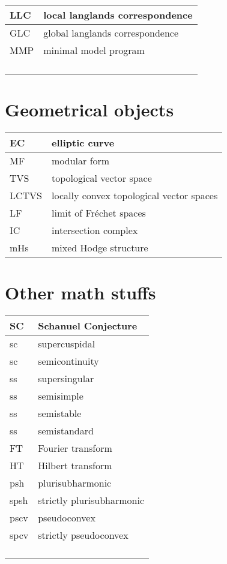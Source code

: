 \documentclass{amsart}
\numberwithin{equation}{section}
\theoremstyle{plain}
\numberwithin{equation}{section}
\theoremstyle{remark}
\begin{document}
\begin{longtable}{l|l}
\hline
LLC & local langlands correspondence \\ \hline
GLC & global langlands correspondence  \\ \hline
MMP & minimal model program\\ \hline
 & \\ \hline
 & \\ \hline
 & \\ \hline
 & \\ \hline
\end{longtable}

\section{Geometrical objects}
\begin{longtable}{l|l}
\hline
EC & elliptic curve \\ \hline
MF & modular form  \\ \hline
TVS & topological vector space\\ \hline
LCTVS &  locally convex topological vector spaces\\ \hline
LF & limit of Fréchet spaces\\ \hline
IC & intersection complex\\ \hline
mHs & mixed Hodge structure\\ \hline
\end{longtable}

\section{Other math stuffs}
\begin{longtable}{l|l}
\hline
SC & Schanuel Conjecture \\ \hline
sc & supercuspidal\\ \hline
sc & semicontinuity\\ \hline
ss & supersingular\\ \hline
ss & semisimple\\ \hline
ss & semistable\\ \hline
ss & semistandard\\ \hline
FT & Fourier transform\\ \hline
HT & Hilbert transform\\ \hline
psh & plurisubharmonic\\ \hline
spsh & strictly plurisubharmonic\\ \hline
pscv & pseudoconvex\\ \hline
spcv & strictly pseudoconvex\\ \hline 
 & \\ \hline
  & \\ \hline
  & \\ \hline
  & \\ \hline


\end{longtable}
\end{document}
